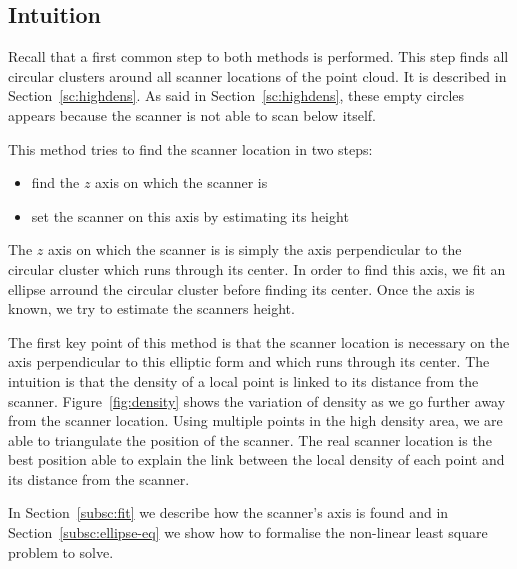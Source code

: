 \subsection{Intuition}
Recall that a first common step to both methods is performed. This step finds all  circular clusters around all scanner locations of the point cloud. It is described in Section~\ref{sc:highdens}. As said in Section~\ref{sc:highdens}, these empty circles appears because the scanner is not able to scan below itself.

This method tries to find the scanner location in two steps:
\begin{itemize}
  \item find the $z$ axis on which the scanner is
  \item set the scanner on this axis by estimating its height
\end{itemize}

The $z$ axis on which the scanner is is simply the axis perpendicular to the circular cluster which runs through its center. In order to find this axis, we fit an ellipse arround the circular cluster before finding its center. Once the axis is known, we try to estimate the scanners height.

The first key point of this method is that the scanner location is necessary on the axis perpendicular to this elliptic form and which runs through its center. The intuition is that the density of a local point is linked to its distance from the scanner. Figure~\ref{fig:density} shows the variation of density as we go further away from the scanner location. Using multiple points in the high density area, we are able to triangulate the position of the scanner. The real scanner location
is the best position able to explain the link between the local density of each point and its distance from the scanner.

In Section~\ref{subsc:fit} we describe how the scanner's axis is found and in  Section~\ref{subsc:ellipse-eq} we show how to formalise the non-linear least square problem to solve.


